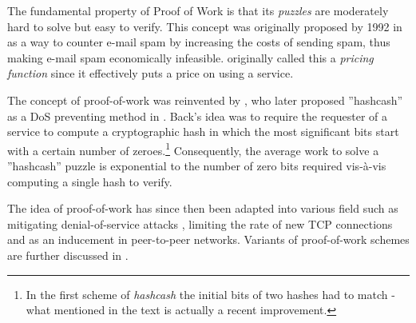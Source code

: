 

The fundamental property of Proof of Work is that its \emph{puzzles} are moderately hard to solve but easy to verify. This concept was originally proposed by \citeauthor{DworkN92} 1992 in  as a way to counter e-mail spam by increasing the costs of sending spam, thus making e-mail spam economically infeasible. \citeauthor{DworkN92} originally called this a \emph{pricing function} since it effectively puts a price on using a service.

The concept of proof-of-work was reinvented by \citeauthor{Back02}, who later proposed ''hashcash'' as a DoS preventing method in . Back's idea was to require the requester of a service to compute a cryptographic hash in which the most significant bits start with a certain number of zeroes.\footnote{In the first scheme of \emph{hashcash} the initial bits of two hashes had to match - what mentioned in the text is actually a recent improvement.} Consequently, the average work to solve a ''hashcash'' puzzle is exponential to the number of zero bits required vis-à-vis computing a single hash to verify\cite{bitcoin}.

The idea of proof-of-work has since then been adapted into various field such as mitigating denial-of-service attacks \cite{mankins}, limiting the rate of new TCP connections \cite{JuelsB99} and as an inducement in peer-to-peer networks\cite{bitcoin,p2p}. Variants of proof-of-work schemes are further discussed in .

\begin{comment}
\begin{GrayBox}[0.75\textwidth]
Impose each request with a cost (e.g. show proof of work to access a service )
\end{GrayBox}
\end{comment}

